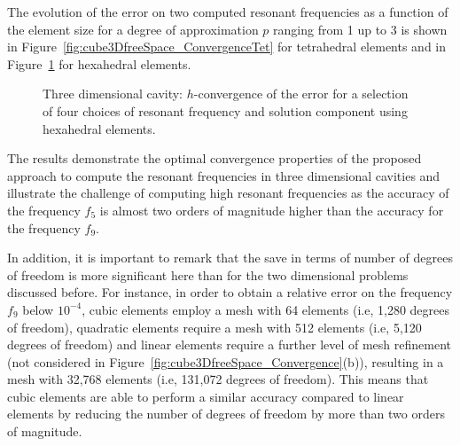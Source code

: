 The evolution of the error on two computed resonant frequencies as a function of the element size for a degree of approximation $p$ ranging from 1 up to 3 is shown in Figure~\ref{fig:cube3DfreeSpace_ConvergenceTet} for tetrahedral elements and in Figure~\ref{fig:cube3DfreeSpace_ConvergenceHex} for hexahedral elements.

\begin{figure}[!ht]
	\centering

	\caption{Three dimensional cavity: $h$-convergence of the error for a selection of four choices of resonant frequency and solution component using hexahedral elements.}
	\label{fig:cube3DfreeSpace_ConvergenceHex}
\end{figure}
The results demonstrate the optimal convergence properties of the proposed approach to compute the resonant frequencies in three dimensional cavities and illustrate the challenge of computing high resonant frequencies as the accuracy of the frequency $f_5$ is almost two orders of magnitude higher than the accuracy for the frequency $f_9$. 

In addition, it is important to remark that the save in terms of number of degrees of freedom is more significant here than for the two dimensional problems discussed before. For instance, in order to obtain a relative error on the frequency $f_9$ below $10^{-4}$, cubic elements employ a mesh with 64 elements (i.e, 1,280 degrees of freedom), quadratic elements require a mesh with 512 elements (i.e, 5,120 degrees of freedom) and linear elements require a further level of mesh refinement (not considered in Figure~\ref{fig:cube3DfreeSpace_Convergence}(b)), resulting in a mesh with 32,768 elements (i.e, 131,072 degrees of freedom). This means that cubic elements are able to perform a similar accuracy compared to linear elements by reducing the number of degrees of freedom by more than two orders of magnitude.

